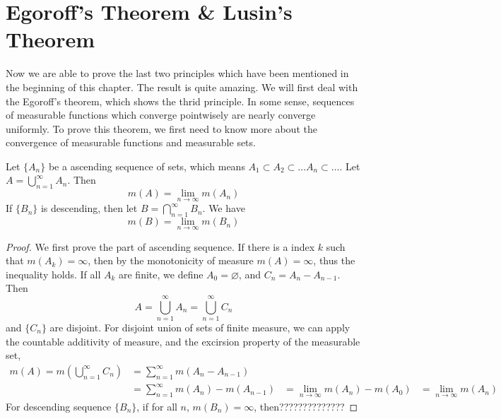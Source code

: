 \documentclass[lang=en, 12pt]{elegantbook}
\begin{document}
        \section{Egoroff's Theorem \& Lusin's Theorem}
            Now we are able to prove the last two principles which have been mentioned in the beginning of this chapter. The result is 
        quite amazing. We will first deal with the Egoroff's theorem, which shows the thrid principle. In some sense, sequences of measurable 
        functions which converge pointwisely are nearly converge uniformly. To prove this theorem, we first need to know more about the
        convergence of measurable functions and measurable sets.
            \begin{proposition}
                Let $\{A_n\}$ be a ascending sequence of sets, which means $A_1 \subset A_2 \subset \dots A_n \subset \dots$.
            Let $A = \bigcup_{n=1}^{\infty} A_n$. Then $$m(A) = \lim_{n \to \infty} m(A_n)$$
                If $\{B_n\}$ is descending, then let $B = \bigcap_{n=1}^{\infty} B_n$. We have 
                $$m(B) = \lim_{n \to \infty} m(B_n)$$

            \end{proposition}
            \begin{proof}
                We first prove the part of ascending sequence. If there is a index $k$ such that $m(A_{k}) = \infty$, then by the monotonicity of 
            measure $m(A) = \infty$, thus the inequality holds. If all $A_k$ are finite, we define $A_0 = \varnothing$, and $C_n = A_n -A_{n-1}$.
            Then$$A = \bigcup_{n=1}^{\infty} A_n =\bigcup_{n=1}^{\infty} C_n$$ 
            and $\{C_n\}$ are disjoint. For disjoint union of sets of finite measure, we can apply the countable additivity of measure, 
            and the excirsion property of the measurable set, 
            \begin{equation*}
                \begin{aligned}
                    m(A) = m(\bigcup_{n=1}^{\infty} C_n) &= \sum_{n=1}^{\infty} m(A_n - A_{n-1})\\
                    &= \sum_{n=1}^{\infty} m(A_n) - m(A_{n-1})
                    &= \lim_{n \to \infty} m(A_n) - m(A_0)
                    &=\lim_{n \to \infty} m(A_n)
                \end{aligned}
            \end{equation*}
                For descending sequence $\{B_n\}$, if for all $n$, $m(B_n) = \infty$, then?????????????? 
            
            \end{proof}
\end{document}
